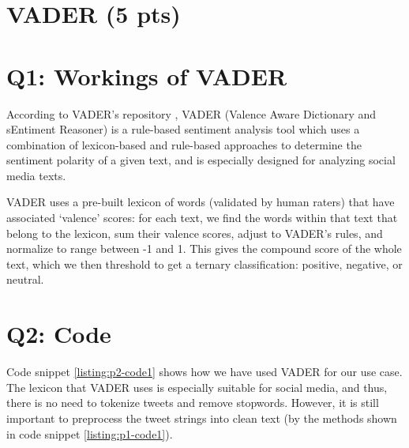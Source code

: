 \section*{VADER (5 pts)}

\section*{Q1: Workings of VADER}

According to VADER’s repository \cite{vader}, VADER (Valence Aware Dictionary and sEntiment Reasoner) is a rule-based sentiment analysis tool which uses a combination of lexicon-based and rule-based approaches to determine the sentiment polarity of a given text, and is especially designed for analyzing social media texts.

VADER uses a pre-built lexicon of words (validated by human raters) that have associated ‘valence’ scores: for each text, we find the words within that text that belong to the lexicon, sum their valence scores, adjust to VADER’s rules, and normalize to range between -1 and 1. This gives the compound score of the whole text, which we then threshold to get a ternary classification: positive, negative, or neutral.


\section*{Q2: Code}

Code snippet \cref{listing:p2-code1} shows how we have used VADER for our use case. The lexicon that VADER uses is especially suitable for social media, and thus, there is no need to tokenize tweets and remove stopwords. However, it is still important to preprocess the tweet strings into clean text (by the methods shown in code snippet \cref{listing:p1-code1}).

